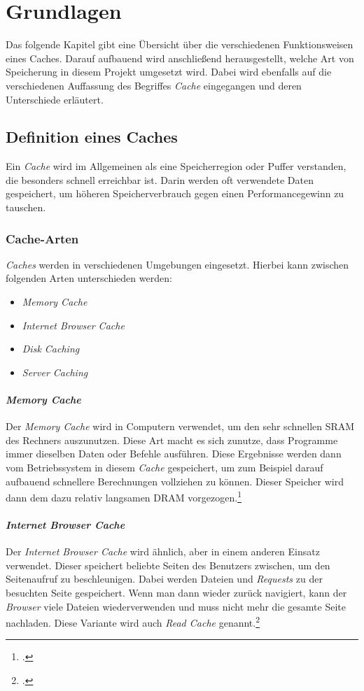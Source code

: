 \chapter{Grundlagen}
\label{cha:grundlagen}
Das folgende Kapitel gibt eine Übersicht über die verschiedenen Funktionsweisen eines Caches. Darauf aufbauend wird anschließend herausgestellt, welche Art von Speicherung in diesem Projekt umgesetzt wird. Dabei wird ebenfalls auf die verschiedenen Auffassung des Begriffes \textit{Cache} eingegangen und deren Unterschiede erläutert.
\section{Definition eines Caches}
\label{sec:cache-definition}
Ein \textit{Cache} wird im Allgemeinen als eine Speicherregion oder Puffer verstanden, die besonders schnell erreichbar ist. Darin werden oft verwendete Daten gespeichert, um höheren Speicherverbrauch gegen einen Performancegewinn zu tauschen.
\subsection{Cache-Arten}
\textit{Caches} werden in verschiedenen Umgebungen eingesetzt. Hierbei kann zwischen folgenden Arten unterschieden werden:
\begin{itemize}
\item \textit{Memory Cache}
\item \textit{Internet Browser Cache}
\item \textit{Disk Caching}
\item \textit{Server Caching}
\end{itemize}
\subsubsection*{\textit{Memory Cache}}
Der \textit{Memory Cache} wird in Computern verwendet, um den sehr schnellen \ac{SRAM} des Rechners auszunutzen. Diese Art macht es sich zunutze, dass Programme immer dieselben Daten oder Befehle ausführen. Diese Ergebnisse werden dann vom Betriebssystem in diesem \textit{Cache} gespeichert, um zum Beispiel darauf aufbauend schnellere Berechnungen vollziehen zu können. Dieser Speicher wird dann dem dazu relativ langsamen \ac{DRAM} vorgezogen.\footcite[Vgl.][S.48f.]{Cache-GummerSommer}
\subsubsection*{\textit{Internet Browser Cache}}
Der \textit{Internet Browser Cache} wird ähnlich, aber in einem anderen Einsatz verwendet. Dieser speichert beliebte Seiten des Benutzers zwischen, um den Seitenaufruf zu beschleunigen. Dabei werden Dateien und \textit{Requests} zu der besuchten Seite gespeichert. Wenn man dann wieder zurück navigiert, kann der \textit{Browser} viele Dateien wiederverwenden und muss nicht mehr die gesamte Seite nachladen. Diese Variante wird auch \textit{Read Cache} genannt.\footcite{Cache-Techtarget}
